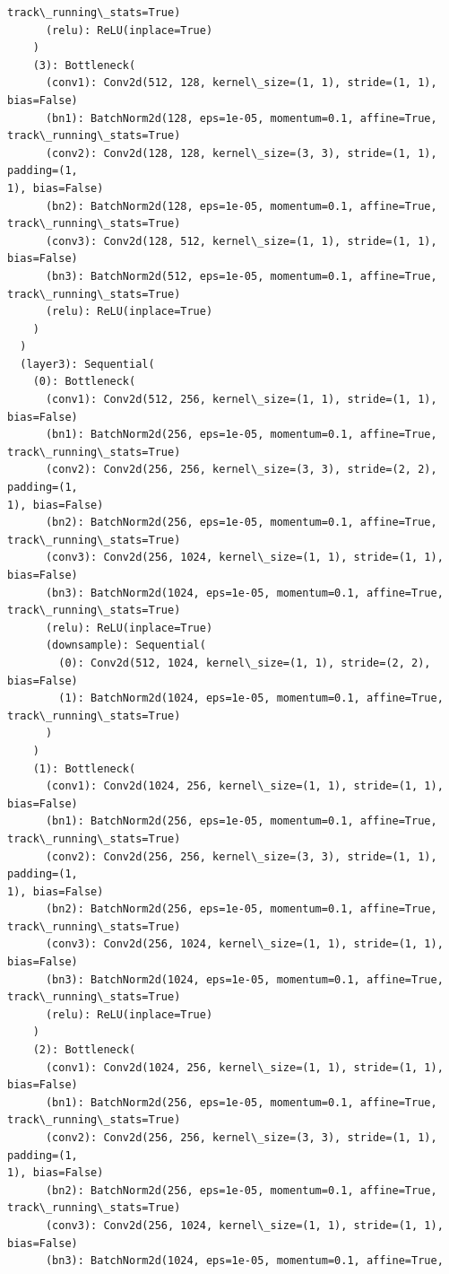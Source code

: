 \documentclass[11pt]{article}
\begin{document}
\begin{tcolorbox}[breakable, size=fbox, boxrule=.5pt, pad at break*=1mm, opacityfill=0]
\begin{Verbatim}[commandchars=\\\{\}]
track\_running\_stats=True)
      (relu): ReLU(inplace=True)
    )
    (3): Bottleneck(
      (conv1): Conv2d(512, 128, kernel\_size=(1, 1), stride=(1, 1), bias=False)
      (bn1): BatchNorm2d(128, eps=1e-05, momentum=0.1, affine=True,
track\_running\_stats=True)
      (conv2): Conv2d(128, 128, kernel\_size=(3, 3), stride=(1, 1), padding=(1,
1), bias=False)
      (bn2): BatchNorm2d(128, eps=1e-05, momentum=0.1, affine=True,
track\_running\_stats=True)
      (conv3): Conv2d(128, 512, kernel\_size=(1, 1), stride=(1, 1), bias=False)
      (bn3): BatchNorm2d(512, eps=1e-05, momentum=0.1, affine=True,
track\_running\_stats=True)
      (relu): ReLU(inplace=True)
    )
  )
  (layer3): Sequential(
    (0): Bottleneck(
      (conv1): Conv2d(512, 256, kernel\_size=(1, 1), stride=(1, 1), bias=False)
      (bn1): BatchNorm2d(256, eps=1e-05, momentum=0.1, affine=True,
track\_running\_stats=True)
      (conv2): Conv2d(256, 256, kernel\_size=(3, 3), stride=(2, 2), padding=(1,
1), bias=False)
      (bn2): BatchNorm2d(256, eps=1e-05, momentum=0.1, affine=True,
track\_running\_stats=True)
      (conv3): Conv2d(256, 1024, kernel\_size=(1, 1), stride=(1, 1), bias=False)
      (bn3): BatchNorm2d(1024, eps=1e-05, momentum=0.1, affine=True,
track\_running\_stats=True)
      (relu): ReLU(inplace=True)
      (downsample): Sequential(
        (0): Conv2d(512, 1024, kernel\_size=(1, 1), stride=(2, 2), bias=False)
        (1): BatchNorm2d(1024, eps=1e-05, momentum=0.1, affine=True,
track\_running\_stats=True)
      )
    )
    (1): Bottleneck(
      (conv1): Conv2d(1024, 256, kernel\_size=(1, 1), stride=(1, 1), bias=False)
      (bn1): BatchNorm2d(256, eps=1e-05, momentum=0.1, affine=True,
track\_running\_stats=True)
      (conv2): Conv2d(256, 256, kernel\_size=(3, 3), stride=(1, 1), padding=(1,
1), bias=False)
      (bn2): BatchNorm2d(256, eps=1e-05, momentum=0.1, affine=True,
track\_running\_stats=True)
      (conv3): Conv2d(256, 1024, kernel\_size=(1, 1), stride=(1, 1), bias=False)
      (bn3): BatchNorm2d(1024, eps=1e-05, momentum=0.1, affine=True,
track\_running\_stats=True)
      (relu): ReLU(inplace=True)
    )
    (2): Bottleneck(
      (conv1): Conv2d(1024, 256, kernel\_size=(1, 1), stride=(1, 1), bias=False)
      (bn1): BatchNorm2d(256, eps=1e-05, momentum=0.1, affine=True,
track\_running\_stats=True)
      (conv2): Conv2d(256, 256, kernel\_size=(3, 3), stride=(1, 1), padding=(1,
1), bias=False)
      (bn2): BatchNorm2d(256, eps=1e-05, momentum=0.1, affine=True,
track\_running\_stats=True)
      (conv3): Conv2d(256, 1024, kernel\_size=(1, 1), stride=(1, 1), bias=False)
      (bn3): BatchNorm2d(1024, eps=1e-05, momentum=0.1, affine=True,

\end{Verbatim}
\end{tcolorbox}
\end{document}
